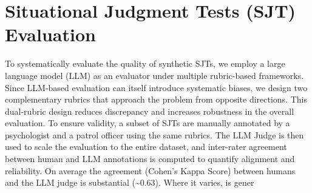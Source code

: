 \documentclass[11pt]{article}
\begin{document}
\section{Situational Judgment Tests (SJT) Evaluation}
\label{sec:sjt_eval}

To systematically evaluate the quality of synthetic SJTs, we employ a large language model (LLM) as an evaluator under multiple rubric-based frameworks. Since LLM-based evaluation can itself introduce systematic biases, we design two complementary rubrics that approach the problem from opposite directions. This dual-rubric design reduces discrepancy and increases robustness in the overall evaluation. To ensure validity, a subset of SJTs are manually annotated by a psychologist and a patrol officer using the same rubrics. The LLM Judge is then used to scale the evaluation to the entire dataset, and inter-rater agreement between human and LLM annotations is computed to quantify alignment and reliability. On average the agreement (Cohen's Kappa Score) between humans and the LLM judge is substantial (\textasciitilde0.63). Where it varies, is gener
\end{document}
